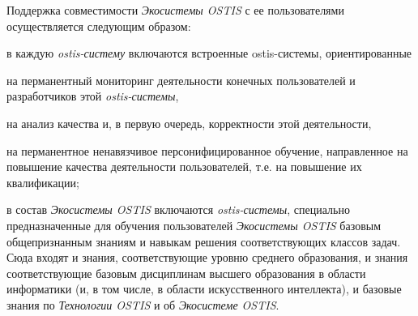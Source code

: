 \begin{SCn}
\begin{scnsubstruct}
{        Поддержка совместимости \textit{Экосистемы OSTIS} с ее пользователями осуществляется следующим образом:
        \begin{scnitemize}
            \item в каждую \textit{ostis-систему} включаются встроенные ostis-системы, ориентированные
            \begin{scnitemizeii}
                \item на перманентный мониторинг деятельности конечных пользователей и разработчиков этой \textit{\mbox{ostis-системы}},
                \item на анализ качества и, в первую очередь, корректности этой деятельности,
                \item на перманентное ненавязчивое персонифицированное обучение, направленное на повышение качества деятельности пользователей, т.е. на повышение их квалификации;
            \end{scnitemizeii}
            \item в состав \textit{Экосистемы OSTIS} включаются \textit{ostis-системы}, специально предназначенные для обучения пользователей \textit{Экосистемы OSTIS} базовым общепризнанным знаниям и навыкам решения соответствующих классов задач. Сюда входят и знания, соответствующие уровню среднего образования, и знания соответствующие базовым дисциплинам высшего образования в области информатики (и, в том числе, в области искусственного интеллекта), и базовые знания по \textit{Технологии OSTIS} и об \textit{Экосистеме OSTIS}.
        \end{scnitemize}}
    

\end{scnsubstruct}
\end{SCn}
